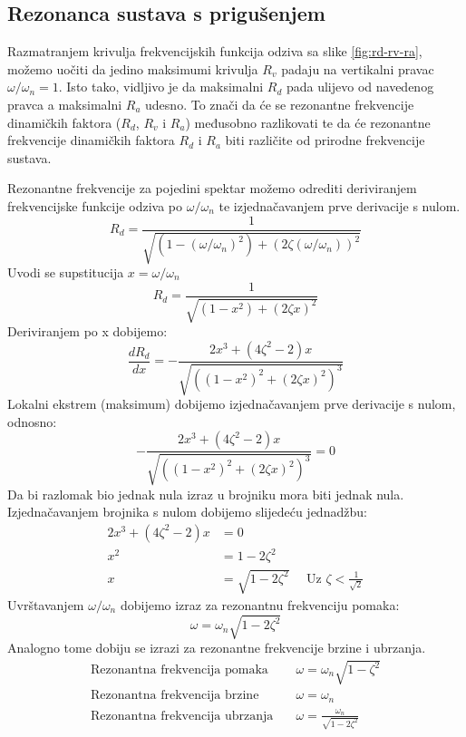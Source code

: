 \subsection{Rezonanca sustava s prigušenjem}
Razmatranjem krivulja frekvencijskih funkcija odziva sa slike 
\ref{fig:rd-rv-ra}, možemo uočiti da jedino maksimumi krivulja $R_v$ padaju na 
vertikalni pravac $\omega/\omega_n=1$. Isto tako, vidljivo je da maksimalni $R_d$
pada ulijevo od navedenog pravca a maksimalni $R_a$ udesno. To znači da će se 
rezonantne frekvencije dinamičkih faktora ($R_d$, $R_v$ i $R_a$) međusobno razlikovati 
te da će rezonantne frekvencije dinamičkih faktora $R_d$ i $R_a$ biti različite od
prirodne frekvencije sustava.

Rezonantne frekvencije za pojedini spektar možemo odrediti deriviranjem frekvencijske 
funkcije odziva po $\omega/\omega_n$ te izjednačavanjem prve derivacije s
nulom.
\[
    R_d = \frac{1}{\sqrt{(1-(\omega/\omega_n)^2) + (2\zeta(\omega/\omega_n))^2}}
\]
Uvodi se supstitucija $x=\omega/\omega_n$
\[
    R_d = \frac{1}{\sqrt{(1-x^2)+(2\zeta x)^2}}
\]
Deriviranjem po x dobijemo:
\[
    \frac{dR_d}{dx}=-\frac{2x^3+(4\zeta^2-2)x}{\sqrt{((1-x^2)^2+(2\zeta x)^2)^3}}
\]
Lokalni ekstrem (maksimum) dobijemo izjednačavanjem prve derivacije s nulom,
odnosno:
\[
    -\frac{2x^3+(4\zeta^2-2)x}{\sqrt{((1-x^2)^2+(2\zeta x)^2)^3}} = 0
\]
Da bi razlomak bio jednak nula izraz u brojniku mora biti jednak nula.
Izjednačavanjem brojnika s nulom dobijemo slijedeću jednadžbu:
\[
    \begin{aligned}
        2x^3+(4\zeta^2-2)x &= 0\\
        x^2 &= 1-2\zeta^2\\
        x &= \sqrt{1-2\zeta^2} \quad \text{ Uz } \zeta < \frac{1}{\sqrt{2}}
    \end{aligned}
\]
Uvrštavanjem $\omega/\omega_n$ dobijemo izraz za rezonantnu frekvenciju pomaka:
\begin{equation}\label{eq:rezonantna_frekvencija_pomak}
    \omega=\omega_n\sqrt{1-2\zeta^2}
\end{equation}
Analogno tome dobiju se izrazi za rezonantne frekvencije brzine i ubrzanja.
\begin{align}
    \text{Rezonantna frekvencija pomaka}\quad & \omega = \omega_n\sqrt{1-\zeta^2}\label{eq:rd_rezonanca}\\
    \text{Rezonantna frekvencija brzine}\quad & \omega = \omega_n\label{eq:rv_rezonanca}\\
    \text{Rezonantna frekvencija ubrzanja}\quad & \omega = \frac{\omega_n}{\sqrt{1-2\zeta^2}}\label{eq:ra_rezonanca}
\end{align}

